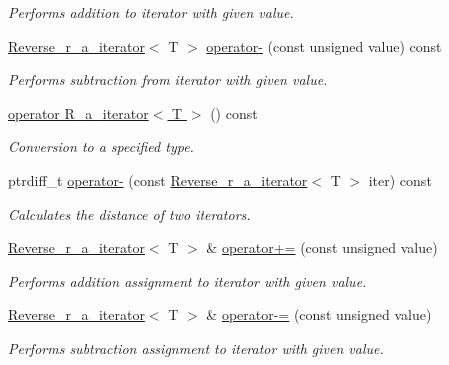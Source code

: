 \begin{DoxyCompactItemize}
\begin{DoxyCompactList}\small\item\em Performs addition to iterator with given value. \end{DoxyCompactList}\item 
\hyperlink{classtasks_1_1Reverse__r__a__iterator}{Reverse\+\_\+r\+\_\+a\+\_\+iterator}$<$ T $>$ \hyperlink{classtasks_1_1Reverse__r__a__iterator_a914fac16bbd129616a9dca4e129e0fbf}{operator-\/} (const unsigned value) const 
\begin{DoxyCompactList}\small\item\em Performs subtraction from iterator with given value. \end{DoxyCompactList}\item 
\hyperlink{classtasks_1_1Reverse__r__a__iterator_a915976c1623e0a0bbc24ee3f108373d1}{operator R\+\_\+a\+\_\+iterator$<$ T $>$} () const \hypertarget{classtasks_1_1Reverse__r__a__iterator_a915976c1623e0a0bbc24ee3f108373d1}{}\label{classtasks_1_1Reverse__r__a__iterator_a915976c1623e0a0bbc24ee3f108373d1}

\begin{DoxyCompactList}\small\item\em Conversion to a specified type. \end{DoxyCompactList}\item 
ptrdiff\+\_\+t \hyperlink{classtasks_1_1Reverse__r__a__iterator_ac3babb3d2d80fa8c7c9f70b753bd9843}{operator-\/} (const \hyperlink{classtasks_1_1Reverse__r__a__iterator}{Reverse\+\_\+r\+\_\+a\+\_\+iterator}$<$ T $>$ iter) const 
\begin{DoxyCompactList}\small\item\em Calculates the distance of two iterators. \end{DoxyCompactList}\item 
\hyperlink{classtasks_1_1Reverse__r__a__iterator}{Reverse\+\_\+r\+\_\+a\+\_\+iterator}$<$ T $>$ \& \hyperlink{classtasks_1_1Reverse__r__a__iterator_a19ab64bd8a1cc4a6df140755779d2f42}{operator+=} (const unsigned value)
\begin{DoxyCompactList}\small\item\em Performs addition assignment to iterator with given value. \end{DoxyCompactList}\item 
\hyperlink{classtasks_1_1Reverse__r__a__iterator}{Reverse\+\_\+r\+\_\+a\+\_\+iterator}$<$ T $>$ \& \hyperlink{classtasks_1_1Reverse__r__a__iterator_a302b178170ede4f4e82d41e2bd110900}{operator-\/=} (const unsigned value)
\begin{DoxyCompactList}\small\item\em Performs subtraction assignment to iterator with given value. \end{DoxyCompactList}\end{DoxyCompactItemize}
